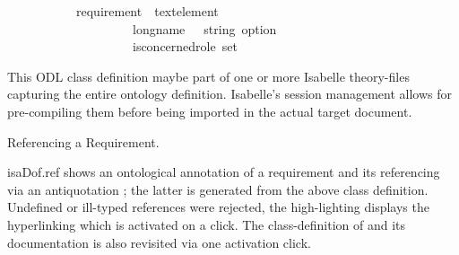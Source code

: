 \begin{isabellebody}
\begin{isamarkuptext}
\begin{isabelle}
\ \ \ \ \ \ \ \ \ \ \ requirement\ {\isacharequal}{\kern0pt}\ text{\isacharunderscore}{\kern0pt}element\ {\isacharplus}{\kern0pt}\ \ \ \isanewline
\ \ \ \ \ \ \ \ \ \ \ \ \ \ \ \ \ \ \ \ long{\isacharunderscore}{\kern0pt}name\ \ \ {\isacharcolon}{\kern0pt}{\isacharcolon}{\kern0pt}{\isachardoublequoteopen}string\ option{\isachardoublequoteclose}\ \ \ \isanewline
\ \ \ \ \ \ \ \ \ \ \ \ \ \ \ \ \ \ \ \ is{\isacharunderscore}{\kern0pt}concerned{\isacharcolon}{\kern0pt}{\isacharcolon}{\kern0pt}{\isachardoublequoteopen}role\ set{\isachardoublequoteclose}\ \ \ \ \ \ \ \ \ 
\end{isabelle}
  This ODL class definition maybe part of one or more Isabelle theory-files capturing the entire
  ontology definition. Isabelle's session management allows for pre-compiling them before being 
  imported in the actual target document.
\end{isamarkuptext}\isamarkuptrue%

\begin{isamarkupsideUNDERSCOREbyUNDERSCOREsideUNDERSCOREfigure*}
[label = {text-elements},type = {Isa_COL.side_by_side_figure}, args={label = {text-elements},type = {Isa_COL.side_by_side_figure}, Isa_COL.side_by_side_figure.anchor = {fig-Req-Def-ex}, Isa_COL.side_by_side_figure.caption = {A Text-Element as Requirement.}, Isa_COL.figure.relative_width = {48}, Isa_COL.figure.src = {figures/Req-Def-ex}, Isa_COL.side_by_side_figure.anchor2 = {fig-Req-Appl-ex}, Isa_COL.side_by_side_figure.caption2 = {Referencing a Requirement.}, Isa_COL.side_by_side_figure.relative_width2 = {48}, Isa_COL.side_by_side_figure.src2 = {figures/Req-Appl-ex}, Isa_COL.figure.spawn_columns = {True}}]Referencing a Requirement.
\end{isamarkupsideUNDERSCOREbyUNDERSCOREsideUNDERSCOREfigure*}\isamarkuptrue%

\begin{isamarkuptext}
\csname isaDof.ref shows an ontological annotation of a requirement and its referencing
  via an antiquotation ; the latter is generated from the above 
  class definition. Undefined or ill-typed references were rejected, the high-lighting displays 
  the hyperlinking which is activated on a click. The class-definition of \isa{requirement} and its 
  documentation is also revisited via one activation click.
\end{isamarkuptext}\isamarkuptrue%


\end{isabellebody}
